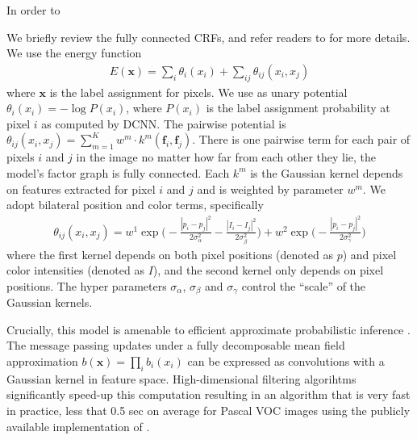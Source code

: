 In order to 

We briefly review the fully connected CRFs, and refer readers to
\citep{krahenbuhl2011efficient} for more details. We use the energy function
\begin{align}
  E(\boldsymbol{x}) = \sum_i \theta_i(x_i) + \sum_{ij} \theta_{ij}(x_i, x_j)
\end{align}
where $\boldsymbol{x}$ is the label assignment for pixels. We use as unary
potential $\theta_i(x_i) = - \log P(x_i)$, where $P(x_i)$ is the label
assignment probability at pixel $i$ as computed by DCNN. The pairwise
potential is $\theta_{ij}(x_i, x_j) = \sum_{m=1}^{K} w^m \cdot
k^m(\boldsymbol{f}_i, \boldsymbol{f}_j)$. There is one pairwise term for each
pair of pixels $i$ and $j$ in the image no matter how far from each other they
lie, \ie the model's factor graph is fully connected. Each $k^m$ is the
Gaussian kernel depends on features extracted for pixel $i$ and $j$ and is
weighted by parameter $w^m$. We adopt bilateral position and color terms,
specifically
\begin{align}
  \label{eq:fully_crf}
  \theta_{ij}(x_i, x_j) = w^1 \exp \Big(-\frac{|p_i-p_j|^2}{2\sigma_\alpha^2} -\frac{|I_i-I_j|^2}{2\sigma_\beta^2} \Big) + w^2 \exp \Big(-\frac{|p_i-p_j|^2}{2\sigma_\gamma^2}\Big)
\end{align}
where the first kernel depends on both pixel positions (denoted as $p$) and
pixel color intensities (denoted as $I$), and the second kernel only depends
on pixel positions. The hyper parameters $\sigma_\alpha$, $\sigma_\beta$ and
$\sigma_\gamma$ control the ``scale'' of the Gaussian kernels.

Crucially, this model is amenable to efficient approximate probabilistic
inference \citep{krahenbuhl2011efficient}. The message passing updates under a
fully decomposable mean field approximation $b(\boldsymbol{x}) = \prod_i
b_i(x_i)$ can be expressed as convolutions with a Gaussian kernel in feature
space. High-dimensional filtering algorihtms \citep{adams2010fast}
significantly speed-up this computation resulting in an algorithm that is very
fast in practice, less that 0.5 sec on average for Pascal VOC images using the
publicly available implementation of \citep{krahenbuhl2011efficient}.

